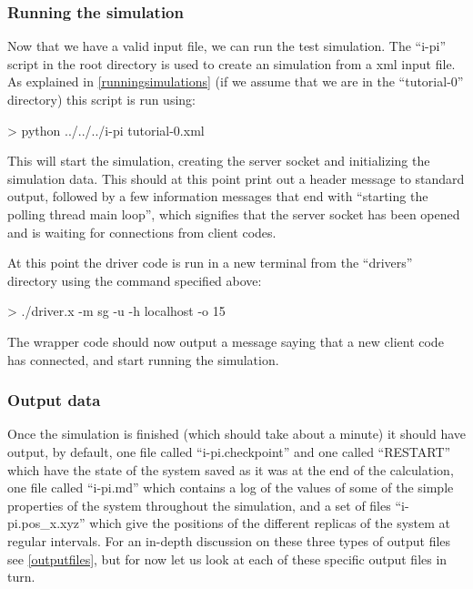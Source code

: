 \documentclass[11pt,english,fleqn]{report}
\newenvironment{code}{%
\footnotesize 
\verbatim
}{
\endverbatim
\normalsize
}
\begin{document}
\subsubsection{Running the simulation}

\label{run1}

Now that we have a valid input file, we can run the test simulation.
The {}``i-pi'' script in the root directory is used to create an
\ipi simulation from a xml input file. As explained in
\ref{runningsimulations} (if we assume that we are in the {}``tutorial-0''
directory) this script is run using:

\begin{code}
> python ../../../i-pi tutorial-0.xml
\end{code}

This will start the \ipi simulation, creating the server socket and
initializing the simulation data. This should at this point print
out a header message to standard output, followed by a few information
messages that end with {}``starting the polling thread main loop'',
which signifies that the server socket has been opened and is waiting
for connections from client codes.

At this point the driver code is run in a new terminal 
from the {}``drivers'' directory using the command
specified above:

\begin{code}
> ./driver.x -m sg -u -h localhost -o 15
\end{code}

The wrapper code should now output a message saying that a new client
code has connected, and start running the simulation.


\subsubsection{Output data}

Once the simulation is finished (which should take about a minute)
it should have output, by default, one file called {}``i-pi.checkpoint''
and one called {}``RESTART'' which have the state of the system
saved as it was at the end of the calculation, one file called {}``i-pi.md''
which contains a log of the values of some of the simple properties
of the system throughout the simulation, and a set of files {}``i-pi.pos\_x.xyz''
which give the positions of the different replicas of the system at
regular intervals. For an in-depth discussion on these three types
of output files see \ref{outputfiles}, but for now let us look at
each of these specific output files in turn.
\end{document}
